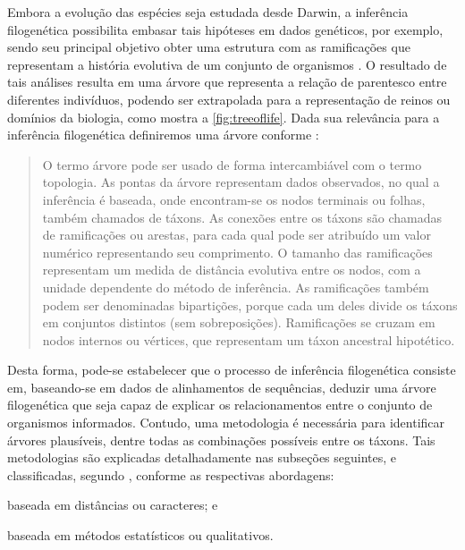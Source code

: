 \documentclass[english,brazilian]{UNISINOSmonografia} %
\begin{document}
Embora a evolução das espécies seja estudada desde Darwin, a inferência filogenética possibilita embasar tais hipóteses em dados genéticos, por exemplo, sendo seu principal objetivo obter uma estrutura com as ramificações que representam a história evolutiva de um conjunto de organismos \cite{Zwickl2006}.
O resultado de tais análises resulta em uma árvore que representa a relação de parentesco entre diferentes indivíduos, podendo ser extrapolada para a representação de reinos ou domínios da biologia, como mostra a \autoref{fig:treeoflife}.
Dada sua relevância para a inferência filogenética definiremos uma árvore conforme :




\begin{quote}
	O termo árvore pode ser usado de forma intercambiável com o termo topologia.
	As pontas da árvore representam dados observados, no qual a inferência é baseada, onde encontram-se os nodos terminais ou folhas, também chamados de táxons.
	As conexões entre os táxons são chamadas de ramificações ou arestas, para cada qual pode ser atribuído um valor numérico representando seu comprimento.
	O tamanho das ramificações representam um medida de distância evolutiva entre os nodos, com a unidade dependente do método de inferência.
	As ramificações também podem ser denominadas bipartições, porque cada um deles divide os táxons em conjuntos distintos (sem sobreposições).
	Ramificações se cruzam em nodos internos ou vértices, que representam um táxon ancestral hipotético.
\end{quote}


Desta forma, pode-se estabelecer que o processo de inferência filogenética consiste em, baseando-se em dados de alinhamentos de sequências, deduzir uma árvore filogenética que seja capaz de explicar os relacionamentos entre o conjunto de organismos informados.
Contudo, uma metodologia é necessária para identificar árvores plausíveis, dentre todas as combinações possíveis entre os táxons.
Tais metodologias são explicadas detalhadamente nas subseções seguintes, e classificadas, segundo , conforme as respectivas abordagens: 
\begin{inparaenum} 
	\item baseada em distâncias ou caracteres; e
	\item baseada em métodos estatísticos ou qualitativos.
\end{inparaenum}
\end{document}

